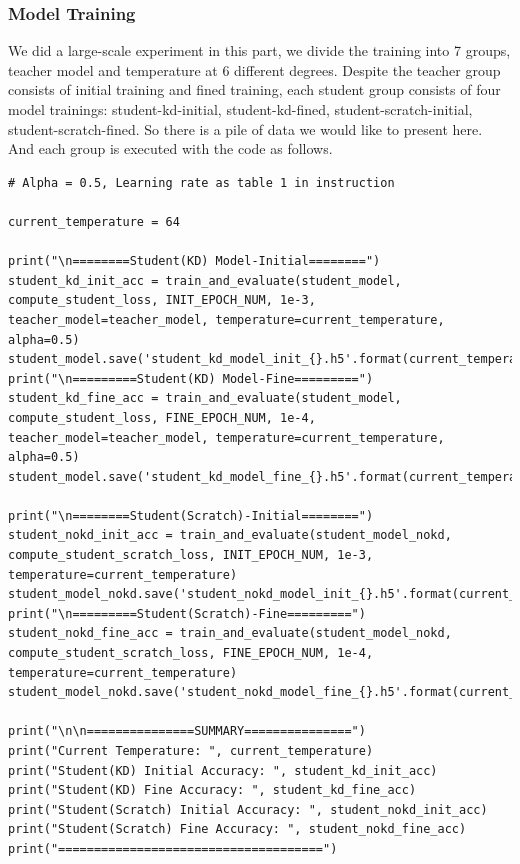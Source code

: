 \documentclass[conference]{IEEEtran}
\begin{document}
\subsubsection{Model Training}

We did a large-scale experiment in this part, we divide the training into 7 groups, teacher model and temperature at 6 different degrees. Despite the teacher group consists of initial training and fined training, each student group consists of four model trainings: student-kd-initial, student-kd-fined, student-scratch-initial, student-scratch-fined. So there is a pile of data we would like to present here. And each group is executed with the code as follows.

\begin{lstlisting}
# Alpha = 0.5, Learning rate as table 1 in instruction

current_temperature = 64

print("\n========Student(KD) Model-Initial========")
student_kd_init_acc = train_and_evaluate(student_model, compute_student_loss, INIT_EPOCH_NUM, 1e-3, teacher_model=teacher_model, temperature=current_temperature, alpha=0.5)
student_model.save('student_kd_model_init_{}.h5'.format(current_temperature))
print("\n=========Student(KD) Model-Fine=========")
student_kd_fine_acc = train_and_evaluate(student_model, compute_student_loss, FINE_EPOCH_NUM, 1e-4, teacher_model=teacher_model, temperature=current_temperature, alpha=0.5)
student_model.save('student_kd_model_fine_{}.h5'.format(current_temperature))

print("\n========Student(Scratch)-Initial========")
student_nokd_init_acc = train_and_evaluate(student_model_nokd, compute_student_scratch_loss, INIT_EPOCH_NUM, 1e-3, temperature=current_temperature)
student_model_nokd.save('student_nokd_model_init_{}.h5'.format(current_temperature))
print("\n=========Student(Scratch)-Fine=========")
student_nokd_fine_acc = train_and_evaluate(student_model_nokd, compute_student_scratch_loss, FINE_EPOCH_NUM, 1e-4, temperature=current_temperature)
student_model_nokd.save('student_nokd_model_fine_{}.h5'.format(current_temperature))

print("\n\n===============SUMMARY===============")
print("Current Temperature: ", current_temperature)
print("Student(KD) Initial Accuracy: ", student_kd_init_acc)
print("Student(KD) Fine Accuracy: ", student_kd_fine_acc)
print("Student(Scratch) Initial Accuracy: ", student_nokd_init_acc)
print("Student(Scratch) Fine Accuracy: ", student_nokd_fine_acc)
print("=====================================")
\end{lstlisting}
\end{document}

